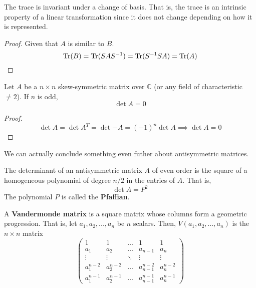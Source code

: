   \begin{corollary}
    The trace is invariant under a change of basis. That is, the trace is an intrinsic property of a linear transformation since it does not change depending on how it is represented. 
  \end{corollary}
  \begin{proof}
    Given that $A$ is similar to $B$. 
    \begin{equation}
      \Tr(B) = \Tr(S A S^{-1}) = \Tr(S^{-1} S A) = \Tr(A) 
    \end{equation}
  \end{proof}

  \begin{theorem}
    Let $A$ be a $n \times n$ skew-symmetric matrix over $\mathbb{C}$ (or any field of characteristic $\neq 2$). If $n$ is odd, 
    \begin{equation}
      \det{A} = 0 
    \end{equation}
  \end{theorem}
  \begin{proof}
    \begin{equation}
      \det{A} = \det{A^T} = \det{-A} = (-1)^n \det{A} \implies \det{A} = 0 
    \end{equation}
  \end{proof}

  We can actually conclude something even futher about antisymmetric matrices. 

  \begin{theorem}
    The determinant of an antisymmetric matrix $A$ of even order is the square of a homogeneous polynomial of degree $n/2$ in the entries of $A$. That is, 
    \begin{equation}
      \det{A} = P^2
    \end{equation}
    The polynomial $P$ is called the \textbf{Pfaffian}. 
  \end{theorem}

  \begin{definition}
    A \textbf{Vandermonde matrix} is a square matrix whose columns form a geometric progression. That is, let $a_1, a_2, ..., a_n$ be $n$ scalars. Then, $V(a_1, a_2, ..., a_n)$ is the $n \times n$ matrix
    \begin{equation}
      \begin{pmatrix}
        1&1&\ldots&1&1 \\
        a_1&a_2&\ldots&a_{n-1}&a_n\\
        \vdots&\vdots&\ddots&\vdots&\vdots\\
        a_1^{n-2}&a_2^{n-2}&\ldots&a_{n-1}^{n-2}&a_n^{n-2}\\
        a_1^{n-1}&a_2^{n-1}&\ldots&a_{n-1}^{n-1}&a_n^{n-1}
      \end{pmatrix}
    \end{equation}
  \end{definition}

